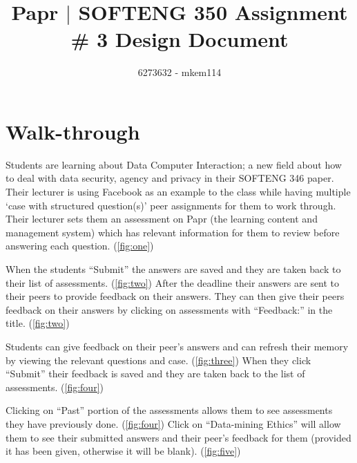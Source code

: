 \documentclass[10pt,a4paper]{article}
\author{6273632 - mkem114}
\title{Papr $|$ SOFTENG 350 Assignment \# 3 Design Document}
\begin{document}
	\pagestyle{fancy}
	\fancyhf{}
	\renewcommand{\headrulewidth}{5pt}
	\renewcommand{\headrule}{\hbox to\headwidth{%
	  \color{orangeBack}\leaders\hrule height \headrulewidth\hfill}}
	\renewcommand{\footrulewidth}{5pt}
	\renewcommand{\footrule}{\hbox to\headwidth{%
	  \color{orangeBack}\leaders\hrule height \footrulewidth\hfill}}
	\renewcommand{\cftsecleader}{\cftdotfill{\cftdotsep}}
	\lfoot{\theauthor}
	\renewcommand{\contentsname}{Table of Contents}

\maketitle
\tableofcontents
\newpage

\section{Walk-through}
	Students are learning about Data Computer Interaction; a new field about how to deal with data security, agency and privacy in their SOFTENG 346 paper. Their lecturer is using Facebook as an example to the class while having multiple `case with structured question(s)' peer assignments for them to work through.\\
	
	Their lecturer sets them an assessment on Papr (the learning content and management system) which has relevant information for them to review before answering each question. (\cref{fig:one})
	
	When the students ``Submit'' the answers are saved and they are taken back to their list of assessments. (\cref{fig:two}) After the deadline their answers are sent to their peers to provide feedback on their answers. They can then give their peers feedback on their answers by clicking on assessments with ``Feedback:'' in the title. (\cref{fig:two})
	
	Students can give feedback on their peer's answers and can refresh their memory by viewing the relevant questions and case. (\cref{fig:three}) When they click ``Submit'' their feedback is saved and they are taken back to the list of assessments. (\cref{fig:four})
	
	Clicking on ``Past'' portion of the assessments allows them to see assessments they have previously done. (\cref{fig:four}) Click on ``Data-mining Ethics'' will allow them to see their submitted answers and their peer's feedback for them (provided it has been given, otherwise it will be blank). (\cref{fig:five}) 
	
\end{document}
